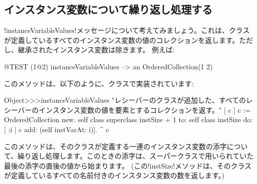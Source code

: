 \documentclass[a4paper,10pt,twoside]{book}
\begin{document}
\subsection{インスタンス変数について繰り返し処理する}

\ct!instanceVariableValues!メッセージについて考えてみましょう。これは、クラスが定義しているすべてのインスタンス変数の値のコレクションを返します。ただし、継承されたインスタンス変数は除きます。
例えば:
\begin{code}{@TEST}
(1@2) instanceVariableValues --> an OrderedCollection(1 2)
\end{code}

このメソッドは、以下のように、クラスで実装されています: %
\begin{code}{}
Object>>>instanceVariableValues
	"レシーバーのクラスが追加した、すべてのレシーバーのインスタンス変数の値を要素とするコレクションを返す。"	
	| c |
	c := OrderedCollection new.
	self class superclass instSize + 1
		to: self class instSize
		do: [ :i | c add: (self instVarAt: i)].
	^ c
\end{code}

このメソッドは、そのクラスが定義する一連のインスタンス変数の添字について、繰り返し処理します。このときの添字は、スーパークラスで用いられていた最後の添字の直後の値から始まります。
(この\ct!instSize!メソッドは、そのクラスが定義しているすべての名前付きのインスタンス変数の数を返します。) %

\end{document}
